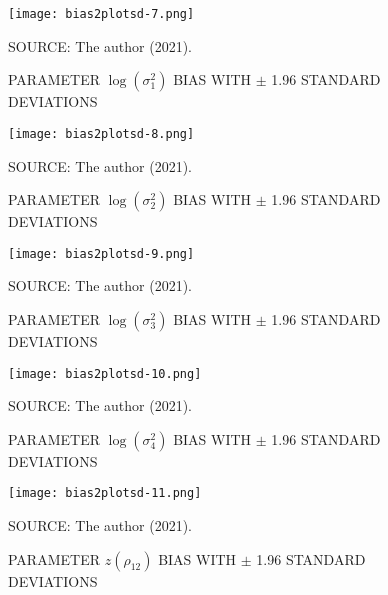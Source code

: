 \begin{figure}[H]
 \setlength{\abovecaptionskip}{.0001pt}
 \caption{PARAMETER \(\log(\sigma_{1}^{2})\) BIAS WITH \(\pm\) 1.96
          STANDARD DEVIATIONS}
 \vspace{0.2cm}\centering
 \texttt{[image: bias2plotsd-7.png]}\\
 \begin{footnotesize}
  SOURCE: The author (2021).
 \end{footnotesize}
 \label{fig:biassdlogs2_1}
\end{figure}

\begin{figure}[H]
 \setlength{\abovecaptionskip}{.0001pt}
 \caption{PARAMETER \(\log(\sigma_{2}^{2})\) BIAS WITH \(\pm\) 1.96
          STANDARD DEVIATIONS}
 \vspace{0.2cm}\centering
 \texttt{[image: bias2plotsd-8.png]}\\
 \begin{footnotesize}
  SOURCE: The author (2021).
 \end{footnotesize}
 \label{fig:biassdlogs2_2}
\end{figure}

\begin{figure}[H]
 \setlength{\abovecaptionskip}{.0001pt}
 \caption{PARAMETER \(\log(\sigma_{3}^{2})\) BIAS WITH \(\pm\) 1.96
          STANDARD DEVIATIONS}
 \vspace{0.2cm}\centering
 \texttt{[image: bias2plotsd-9.png]}\\
 \begin{footnotesize}
  SOURCE: The author (2021).
 \end{footnotesize}
 \label{fig:biassdlogs2_3}
\end{figure}

\begin{figure}[H]
 \setlength{\abovecaptionskip}{.0001pt}
 \caption{PARAMETER \(\log(\sigma_{4}^{2})\) BIAS WITH \(\pm\) 1.96
          STANDARD DEVIATIONS}
 \vspace{0.2cm}\centering
 \texttt{[image: bias2plotsd-10.png]}\\
 \begin{footnotesize}
  SOURCE: The author (2021).
 \end{footnotesize}
 \label{fig:biassdlogs2_4}
\end{figure}

\begin{figure}[H]
 \setlength{\abovecaptionskip}{.0001pt}
 \caption{PARAMETER \(z(\rho_{12})\) BIAS WITH \(\pm\) 1.96 STANDARD
          DEVIATIONS}
 \vspace{0.2cm}\centering
 \texttt{[image: bias2plotsd-11.png]}\\
 \begin{footnotesize}
  SOURCE: The author (2021).
 \end{footnotesize}
 \label{fig:biassdrhoz12}
\end{figure}

